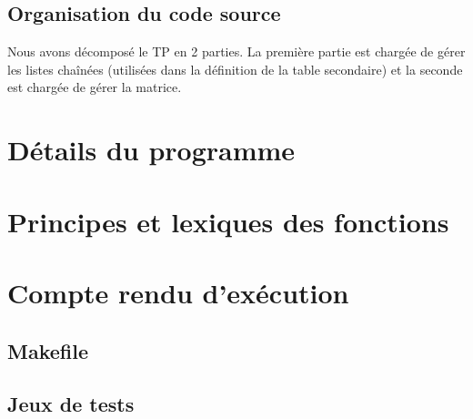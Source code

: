 \documentclass{report}
\begin{document}
    
    \section{Organisation du code source}
      Nous avons décomposé le TP en 2 parties. La première partie est chargée de gérer les listes chaînées (utilisées dans la définition de la table secondaire) et la seconde est chargée de gérer la matrice.

    
  \chapter{Détails du programme}
    

  \chapter{Principes et lexiques des fonctions}
    

  \chapter{Compte rendu d'exécution}
    \section{Makefile}

    \section{Jeux de tests}
      
\end{document}
